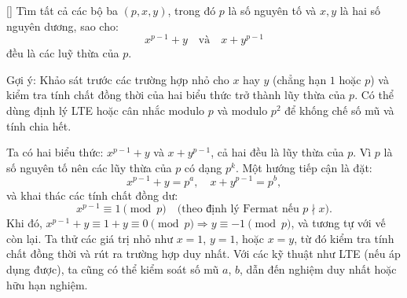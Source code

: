 \documentclass[../04-diophantine-equations.tex]{subfiles}
\begin{document}
\begin{exercise*}\label{example:FRA-2015-TST3-P9}[\textbf{}]
    Tìm tất cả các bộ ba \( (p, x, y) \), trong đó \( p \) là số nguyên tố và \( x, y \) là hai số nguyên dương, sao cho:
    \[
        x^{p-1} + y \quad \text{và} \quad x + y^{p-1}
    \]
    đều là các luỹ thừa của \( p \).
\end{exercise*}

\begin{remark*}
    Gợi ý: Khảo sát trước các trường hợp nhỏ cho \(x\) hay \(y\) (chẳng hạn \(1\) hoặc \(p\)) và kiểm tra tính chất đồng thời của hai biểu thức trở thành lũy thừa của \(p\).  
    Có thể dùng định lý LTE hoặc cân nhắc modulo \(p\) và modulo \(p^2\) để khống chế số mũ và tính chia hết.
\end{remark*}

\begin{story*}
    Ta có hai biểu thức: \( x^{p-1} + y \) và \( x + y^{p-1} \), cả hai đều là lũy thừa của \( p \). Vì \( p \) là số nguyên tố nên các lũy thừa của \( p \) có dạng \( p^k \).  
    Một hướng tiếp cận là đặt:
    \[
        x^{p-1} + y = p^a, \quad x + y^{p-1} = p^b,
    \]
    và khai thác các tính chất đồng dư:
    \[
        x^{p-1} \equiv 1 \pmod{p} \quad \text{(theo định lý Fermat nếu } p \nmid x).
    \]
    Khi đó, \( x^{p-1} + y \equiv 1 + y \equiv 0 \pmod{p} \Rightarrow y \equiv -1 \pmod{p} \), và tương tự với vế còn lại.  
    Ta thử các giá trị nhỏ như \( x = 1 \), \( y = 1 \), hoặc \( x = y \), từ đó kiểm tra tính chất đồng thời và rút ra trường hợp duy nhất.  
    Với các kỹ thuật như LTE (nếu áp dụng được), ta cũng có thể kiểm soát số mũ \( a \), \( b \), dẫn đến nghiệm duy nhất hoặc hữu hạn nghiệm.
\end{story*}
\end{document}
